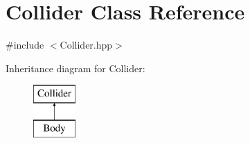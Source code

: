 \hypertarget{class_collider}{\section{Collider Class Reference}
\label{class_collider}
}


{\ttfamily \#include $<$Collider.\-hpp$>$}

Inheritance diagram for Collider\-:\begin{figure}[H]
\begin{center}
\leavevmode
\includegraphics[height=2.000000cm]{class_collider}
\end{center}
\end{figure}
